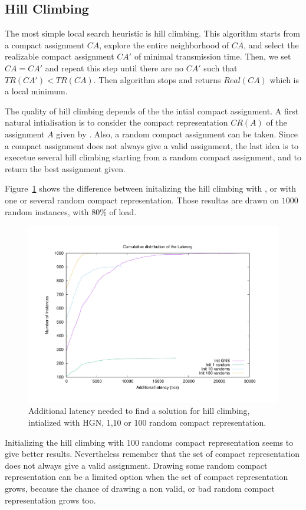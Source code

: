 \documentclass[english]{article}
\begin{document}
\subsection{Hill Climbing}

The most simple local search heuristic is hill climbing. This algorithm starts from a compact assignment $CA$, explore the entire neighborhood of $CA$, and select the realizable compact assignment $CA'$ of minimal transmission time. Then, we set $CA = CA'$ and repeat this step until there are no $CA'$ such that $TR(CA') < TR(CA)$. Then algorithm stops and returns $Real(CA)$ which is a local minimum. 

The quality of hill climbing depends of the the intial compact assignment. A first natural intialisation is to consider the compact representation $CR(A)$ of the assignment $A$ given by \hybridgreedynormalized. Also, a random compact assignment can be taken. Since a compact assignment does not always give a valid assignment, the last idea is to execetue several hill climbing starting from a random compact assignment, and to return the best assignment given.

Figure~\ref{fig:descente07} shows the difference between initalizing the hill climbing with \hybridgreedynormalized, or with one or several random compact representation. Those resultas are drawn on $1000$ random instances, with $80\%$ of load.
\begin{figure}[h]
	\centering
	\includegraphics[scale=0.3]{descente07}
\caption{ Additional latency needed to find a solution for hill climbing, intialized with HGN, 1,10 or 100 random compact representation.}
\label{fig:descente07}
\end{figure}
Initializing the hill climbing with 100 randoms compact representation seems to give better results. Nevertheless remember that the set of compact representation does not always give a valid assignment. Drawing some random compact representation can be a limited option when the set of compact representation grows, because the chance of drawing a non valid, or bad random compact representation grows too.
\end{document}
